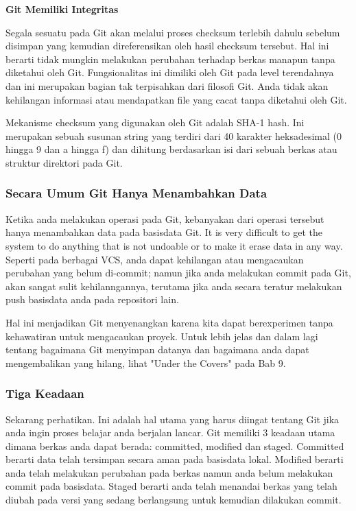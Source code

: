 \textbf{Git Memiliki Integritas}\vspace{12pt}

Segala sesuatu pada Git akan melalui proses checksum terlebih dahulu 
sebelum disimpan yang kemudian direferensikan oleh hasil checksum 
tersebut. Hal ini berarti tidak mungkin melakukan perubahan terhadap 
berkas manapun tanpa diketahui oleh Git. Fungsionalitas ini dimiliki 
oleh Git pada level terendahnya dan ini merupakan bagian tak terpisahkan 
dari filosofi Git. Anda tidak akan kehilangan informasi atau mendapatkan 
file yang cacat tanpa diketahui oleh Git.\vspace{12pt}

Mekanisme checksum yang digunakan oleh Git adalah SHA-1 hash. Ini 
merupakan sebuah susunan string yang terdiri dari 40 karakter 
heksadesimal (0 hingga 9 dan a hingga f) dan dihitung berdasarkan isi 
dari sebuah berkas atau struktur direktori pada Git.\vspace{12pt}

\subsubsection{Secara Umum Git Hanya Menambahkan Data}\vspace{12pt}
Ketika anda melakukan operasi pada Git, kebanyakan dari operasi tersebut 
hanya menambahkan data pada basisdata Git. It is very difficult to get 
the system to do anything that is not undoable or to make it erase data 
in any way. Seperti pada berbagai VCS, anda dapat kehilangan atau 
mengacaukan perubahan yang belum di-commit; namun jika anda melakukan 
commit pada Git, akan sangat sulit kehilanngannya, terutama jika anda 
secara teratur melakukan push basisdata anda pada repositori lain.\vspace{12pt}

Hal ini menjadikan Git menyenangkan karena kita dapat berexperimen tanpa 
kehawatiran untuk mengacaukan proyek. Untuk lebih jelas dan dalam lagi 
tentang bagaimana Git menyimpan datanya dan bagaimana anda dapat 
mengembalikan yang hilang, lihat "Under the Covers" pada Bab 9.\vspace{12pt}

\subsubsection{Tiga Keadaan}\vspace{12pt}
Sekarang perhatikan. Ini adalah hal utama yang harus diingat tentang Git 
jika anda ingin proses belajar anda berjalan lancar. Git memiliki 3 
keadaan utama dimana berkas anda dapat berada: committed, modified dan 
staged. Committed berarti data telah tersimpan secara aman pada 
basisdata lokal. Modified berarti anda telah melakukan perubahan pada 
berkas namun anda belum melakukan commit pada basisdata. Staged berarti 
anda telah menandai berkas yang telah diubah pada versi yang sedang 
berlangsung untuk kemudian dilakukan commit.\vspace{12pt}


